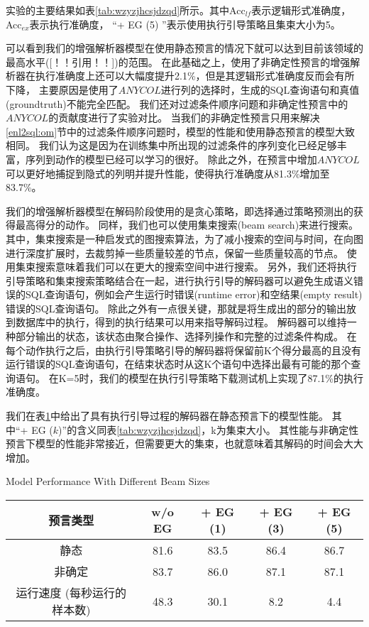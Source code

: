 实验的主要结果如表\ref{tab:wzyzjhcsjdzqd}所示。其中Acc$_{lf}$表示逻辑形式准确度，Acc$_{ex}$表示执行准确度，
“+ EG (5) ”表示使用执行引导策略且集束大小为5。

可以看到我们的增强解析器模型在使用静态预言的情况下就可以达到目前该领域的最高水平([！！引用！！])的范围。
在此基础之上，使用了非确定性预言的增强解析器在执行准确度上还可以大幅度提升2.1\%，但是其逻辑形式准确度反而会有所下降，
主要原因是使用了$ANYCOL$进行列的选择时，生成的SQL查询语句和真值(groundtruth)不能完全匹配。
我们还对过滤条件顺序问题和非确定性预言中的$ANYCOL$的贡献度进行了实验对比。
当我们的非确定性预言只用来解决\ref{enl2sql:om}节中的过滤条件顺序问题时，模型的性能和使用静态预言的模型大致相同。
我们认为这是因为在训练集中所出现的过滤条件的序列变化已经足够丰富，序列到动作的模型已经可以学习的很好。
除此之外，在预言中增加$ANYCOL$可以更好地捕捉到隐式的列明并提升性能，使得执行准确度从81.3\%增加至83.7\%。

我们的增强解析器模型在解码阶段使用的是贪心策略，即选择通过策略预测出的获得最高得分的动作。
同样，我们也可以使用集束搜索(beam search)来进行搜索。
其中，集束搜索是一种启发式的图搜索算法，为了减小搜索的空间与时间，在向图进行深度扩展时，去裁剪掉一些质量较差的节点，保留一些质量较高的节点。
使用集束搜索意味着我们可以在更大的搜索空间中进行搜索。
另外，我们还将执行引导策略和集束搜索策略结合在一起，进行执行引导的解码器可以避免生成语义错误的SQL查询语句，例如会产生运行时错误(runtime error)和空结果(empty result)错误的SQL查询语句。
除此之外有一点很关键，那就是将生成出的部分的输出放到数据库中的执行，得到的执行结果可以用来指导解码过程。
解码器可以维持一种部分输出的状态，该状态由聚合操作、选择列操作和完整的过滤条件构成。
在每个动作执行之后，由执行引导策略引导的解码器将保留前K个得分最高的且没有运行错误的SQL查询语句，在结束状态时从这K个语句中选择出最有可能的那个查询语句。
在K=5时，我们的模型在执行引导策略下载测试机上实现了87.1\%的执行准确度。

我们在表\ref{enl2sql:sybtjsdxdmxxn}中给出了具有执行引导过程的解码器在静态预言下的模型性能。
其中“+ EG ($k$)”的含义同表\ref{tab:wzyzjhcsjdzqd}，k为集束大小。
其性能与非确定性预言下模型的性能非常接近，但需要更大的集束，也就意味着其解码的时间会大大增加。

\begin{table}[!hpb]
  \centering
    {Model Performance With Different Beam Sizes}
  \label{enl2sql:sybtjsdxdmxxn}
  \begin{tabular}{ccccc} \toprule
    \textbf{预言类型} & \textbf{w/o EG} & \textbf{+ EG (1)} & \textbf{+ EG (3)} & \textbf{+ EG (5)}\\\midrule
    静态 & 81.6 & 83.5 & 86.4 & 86.7\\
    非确定 & 83.7 & 86.0 & 87.1 & 87.1\\\midrule
    运行速度 (每秒运行的样本数) & 48.3 & 30.1 & 8.2 & 4.4\\
    \bottomrule
  \end{tabular}
\end{table}

